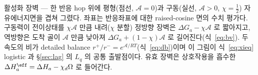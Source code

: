 \caption{활성화 장벽 --- 한 반응 hop 위에 평형(점선, $\mathcal A{=}0$)과 구동(실선, $\mathcal A{>}0$,
$\chi{=}\tfrac12$) 자유에너지면을 겹쳐 그렸다. 좌표는 반응좌표에 대한 raised-cosine 면의 수치 평가다. 구동력이
전이상태를 $\chi\mathcal A$ 만큼 내려($\chi$ 분할) 정방향 장벽은 $\Delta G_a-\chi\mathcal A$ 로 짧아지고, 역방향은
도착 골이 $\mathcal A$ 만큼 낮아져 $\Delta G_a+(1-\chi)\mathcal A$ 로 길어진다(식~\eqref{eq:bv}). 두 속도의 비가
detailed balance $r^+/r^-=e^{\mathcal A/RT}$(식~\eqref{eq:db})이며 이 그림이 식~\eqref{eq:xieq} logistic 과
\S\ref{sec:lag} 의 $L_q$ 의 공통 출발점이다. 유효 장벽은 상호작용을 흡수한 $\Delta H_a^\eff=\Delta H_a-\chi_d\Omega$
로 들어간다.}
\label{fig:barrier}
